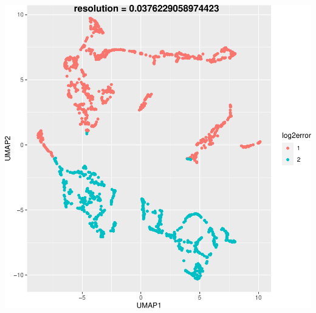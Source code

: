 \documentclass{beamer}
\begin{document}
{\begin{columns}
\begin{column}{0.50\textwidth}
			\includegraphics[width=\textwidth]{umap_err.pdf}
		\end{column}
	\end{columns}
}
\end{document}

